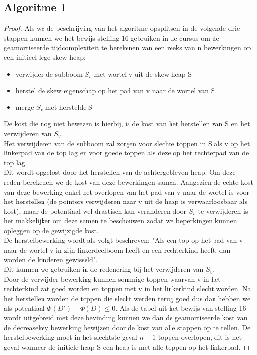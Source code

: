 \documentclass[10pt,a4paper,twoside]{article}
\begin{document}
\subsection{Algoritme 1}
\begin{proof}
Als we de beschrijving van het algoritme opsplitsen in de volgende drie stappen kunnen we het bewijs stelling 16 gebruiken in de cursus om de geamortiseerde tijdcomplexiteit te berekenen van een reeks van n bewerkingen op een initieel lege skew heap:
\begin{itemize}
    \item verwijder de subboom $S_v$ met wortel v uit de skew heap S
    \item herstel de skew eigenschap op het pad van v naar de wortel van S
    \item merge $S_v$ met herstelde S
\end{itemize}
De kost die nog niet bewezen is hierbij, is de kost van het herstellen van S en het verwijderen van $S_v$.\\
Het verwijderen van de subboom zal zorgen voor slechte toppen in S als v op het linkerpad van de top lag en voor goede toppen als deze op het rechterpad van de top lag.\\
Dit wordt opgelost door het herstellen van de achtergebleven heap. Om deze reden berekenen we de kost van deze bewerkingen samen. Aangezien de echte kost van deze bewerking enkel het overlopen van het pad van v naar de wortel is voor het herstellen (de pointers verwijderen naar v uit de heap is verwaarloosbaar als kost), maar de potentiaal wel drastisch kan veranderen door $S_v$ te verwijderen is het makkelijker om deze samen te beschouwen zodat we beperkingen kunnen opleggen op de gewijzigde kost.\\
De herstelbewerking wordt als volgt beschreven: "Als een top op het pad van v naar de wortel v in zijn linkerdeelboom heeft en een rechterkind heeft, dan worden de kinderen gewisseld".\\
Dit kunnen we gebruiken in de redenering bij het verwijderen van $S_v$.\\
Door de verwijder bewerking kunnen sommige toppen waarvan v in het rechterkind zat goed worden en toppen met v in het linkerkind slecht worden. Na het herstellen worden de toppen die slecht werden terug goed dus dan hebben we als potentiaal $\Phi(D')-\Phi(D)\leq0$. Als de tabel uit het bewijs van stelling 16 wordt uitgebreid met deze bevinding kunnen we dan de geamortiseerde kost van de decreasekey bewerking bewijzen door de kost van alle stappen op te tellen. De herstelbewerking moet in het slechtste geval $n-1$ toppen overlopen, dit is het geval wanneer de initiele heap S een heap is met alle toppen op het linkerpad.


\end{proof}
\end{document}
